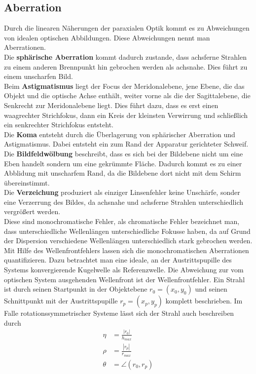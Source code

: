 \documentclass[twoside,colorback,accentcolor=tud4c,11pt]{tudreport}
\begin{document}
\subsection{Aberration}
Durch die linearen Näherungen der paraxialen Optik kommt es zu Abweichungen von idealen optischen Abbildungen. Diese Abweichungen nennt man Aberrationen.\\
Die \textbf{sphärische Aberration} kommt dadurch zustande, dass achsferne Strahlen zu einem anderen Brennpunkt hin gebrochen werden als achsnahe. Dies führt zu einem unscharfen Bild.\\
Beim \textbf{Astigmatismus} liegt der Focus der Meridonalebene, jene Ebene, die das Objekt und die optische Achse enthält, weiter vorne als die der Sagittalebene, die Senkrecht zur Meridonalebene liegt. Dies führt dazu, dass es erst einen waagrechter Strichfokus, dann ein Kreis der kleinsten Verwirrung und schließlich ein senkrechter Strichfokus entsteht.\\
Die \textbf{Koma} entsteht durch die Überlagerung von sphärischer Aberration und Astigmatismus. Dabei entsteht ein zum Rand der Apparatur gerichteter Schweif.\\
Die \textbf{Bildfeldwölbung} beschreibt, dass es sich bei der Bildebene nicht um eine Eben handelt sondern um eine gekrümmte Fläche. Dadurch kommt es zu einer Abblidung mit unscharfem Rand, da die Bildebene dort nicht mit dem Schirm übereinstimmt.\\
Die \textbf{Verzeichung} produziert als einziger Linsenfehler keine Unschärfe, sonder eine Verzerrung des Bildes, da achsnahe und achsferne Strahlen unterschiedlich vergrößert werden.\\
Diese sind monochromatische Fehler, als chromatische Fehler bezeichnet man, dass unterschiedliche Wellenlängen unterschiedliche Fokusse haben, da auf Grund der Dispersion verschiedene Wellenlängen unterschiedlich stark gebrochen werden.\\
Mit Hilfe des Wellenfrontfehlers lassen sich die monochromatischen Aberrationen quantifizieren. Dazu betrachtet man eine ideale, an der Austrittspupille des Systems konvergierende Kugelwelle als Referenzwelle. Die Abweichung zur vom optischen System ausgehenden Wellenfront ist der Wellenfrontfehler. Ein Strahl ist durch seinen Startpunkt in der Objektebene $r_0 = (x_0, y_0)$ und seinen Schnittpunkt mit der Austrittspupille $r_p = (x_p, y_p)$ komplett beschrieben. Im Falle rotationssymmetrischer Systeme lässt sich der Strahl auch beschreiben durch
\begin{align}
\eta&=\frac{|r_0|}{h_{max}}\\
\rho&=\frac{|r_p|}{r_{max}}\\
\theta&=\angle(r_0,r_p)
\end{align}
\end{document}
